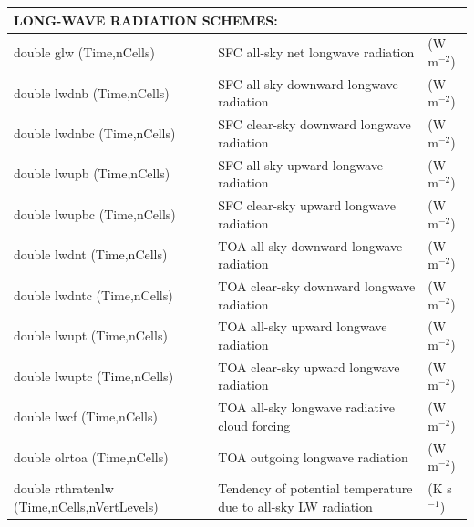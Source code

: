 \documentclass[11pt]{report}
\begin{document}
{\begin{longtable}{|p{2.0in} |p{3.0in} |p{1.0in} |}
\multicolumn{3}{|l|}{{\rule[-3mm]{0mm}{8mm}\bf LONG-WAVE RADIATION SCHEMES:} \hfill}\\ \hline
double glw (Time,nCells)  & SFC all-sky net longwave radiation & (W m$^{-2}$) \\ \hline
double lwdnb (Time,nCells)  & SFC all-sky downward longwave radiation & (W m$^{-2}$) \\ \hline
double lwdnbc (Time,nCells)  & SFC clear-sky downward longwave radiation & (W m$^{-2}$) \\ \hline
double lwupb (Time,nCells)  & SFC all-sky upward longwave radiation & (W m$^{-2}$) \\ \hline
double lwupbc (Time,nCells)  & SFC clear-sky upward longwave radiation & (W m$^{-2}$) \\ \hline
double lwdnt (Time,nCells)  & TOA all-sky downward longwave radiation & (W m$^{-2}$) \\ \hline
double lwdntc (Time,nCells) & TOA clear-sky downward longwave radiation & (W m$^{-2}$) \\ \hline
double lwupt (Time,nCells)  & TOA all-sky upward longwave radiation & (W m$^{-2}$) \\ \hline
double lwuptc (Time,nCells)  & TOA clear-sky upward longwave radiation & (W m$^{-2}$) \\ \hline
double lwcf (Time,nCells)  & TOA all-sky longwave radiative cloud forcing & (W m$^{-2}$) \\ \hline
double olrtoa (Time,nCells) & TOA outgoing longwave radiation & (W m$^{-2}$) \\ \hline 
double rthratenlw \hfil\break (Time,nCells,nVertLevels)  & Tendency of potential temperature due to all-sky LW radiation & (K s$^{-1}$) \\ \hline


\end{longtable}}
\end{document}
